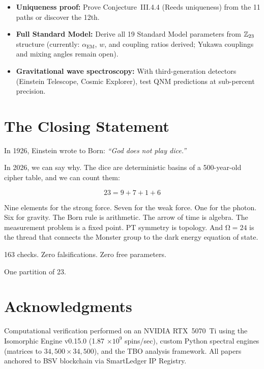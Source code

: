 \documentclass[12pt,a4paper]{article}
\theoremstyle{definition}\newtheorem{definition}[theorem]{Definition}
\theoremstyle{remark}\newtheorem{remark}[theorem]{Remark}
\renewcommand{\O}{\mathrm{\Omega}}
\begin{document}
\begin{itemize}
  \item \textbf{Uniqueness proof:} Prove Conjecture~III.4.4 (Reeds uniqueness)
  from the 11 paths or discover the 12th.

  \item \textbf{Full Standard Model:} Derive all 19 Standard Model parameters
  from $\mathbb{Z}_{23}$ structure (currently: $\alpha_{\mathrm{EM}}$, $w$, and coupling
  ratios derived; Yukawa couplings and mixing angles remain open).

  \item \textbf{Gravitational wave spectroscopy:} With third-generation
  detectors (Einstein Telescope, Cosmic Explorer), test QNM predictions at
  sub-percent precision.
\end{itemize}

\section{The Closing Statement}
\label{sec:closing}

In 1926, Einstein wrote to Born: \emph{``God does not play dice.''}

In 2026, we can say why. The dice are deterministic basins of a
500-year-old cipher table, and we can count them:

\begin{equation}
\boxed{23 = 9 + 7 + 1 + 6}
\end{equation}

Nine elements for the strong force. Seven for the weak force. One for the
photon. Six for gravity. The Born rule is arithmetic. The arrow of time is
algebra. The measurement problem is a fixed point. PT symmetry is topology.
And $\O = 24$ is the thread that connects the Monster group to the
dark energy equation of state.

163 checks. Zero falsifications. Zero free parameters.

One partition of 23.

\section*{Acknowledgments}

Computational verification performed on an NVIDIA RTX~5070~Ti using the
Isomorphic Engine v0.15.0 (1.87 $\times 10^9$ spins/sec), custom Python
spectral engines (matrices to $34{,}500 \times 34{,}500$), and the TBO
analysis framework. All papers anchored to BSV blockchain via SmartLedger
IP Registry.
\end{document}
